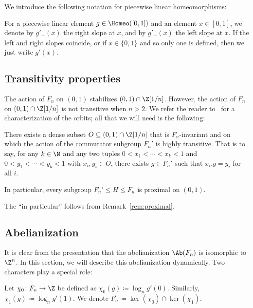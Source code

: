 We introduce the following notation for piecewise linear homeomorphisms:

\begin{defi}
For a piecewise linear element $g \in \Homeo([0, 1])$ and an element $x \in [0, 1]$, we denote by $g'_+(x)$ the right slope at $x$, and by $g'_-(x)$ the left slope at $x$. If the left and right slopes coincide, or if $x \in \{0, 1\}$ and so only one is defined, then we just write $g'(x)$.
\end{defi}


\subsection{Transitivity properties}

The action of $F_n$ on $(0,1)$ stabilizes $(0,1)\cap \Z[1/n]$. However, the action of $F_n$ on $(0,1)\cap \Z[1/n]$ is not transitive when $n > 2$. We refer the reader to~\cite[Section 3]{hydelodha} for a characterization of the orbits; all that we will need is the following:

\begin{cit}
\label{cit:proximal}

There exists a dense subset $O \subseteq (0, 1) \cap \Z[1/n]$ that is $F_n$-invariant and on which the action of the commutator subgroup $F_n'$ is highly transitive. That is to say, for any $k\in\N$ and any two tuples $0 < x_1 < \cdots < x_k < 1$ and $0 < y_1 < \cdots < y_k < 1$ with $x_i, y_i \in O$, there exists $g \in F_n'$ such that $x_i.g = y_i$ for all $i$.

In particular, every subgroup $F_n' \leq H \leq F_n$ is proximal on $(0, 1)$.
\end{cit}

The ``in particular'' follows from Remark~\ref{rem:proximal}.


\subsection{Abelianization}

It is clear from the presentation that the abelianization $\Ab(F_n)$ is isomorphic to $\Z^n$. In this section, we will describe this abelianization dynamically. Two characters play a special role:

\begin{defi}
\label{def:chi01}
    Let $\chi_0 \colon F_n \to \Z$ be 	defined as $\chi_0(g) \coloneqq \log_n g'(0)$. Similarly, $\chi_1(g) \coloneqq \log_n g'(1)$. We denote $F_n^c \coloneqq \ker(\chi_0) \cap \ker(\chi_1)$.
\end{defi}

